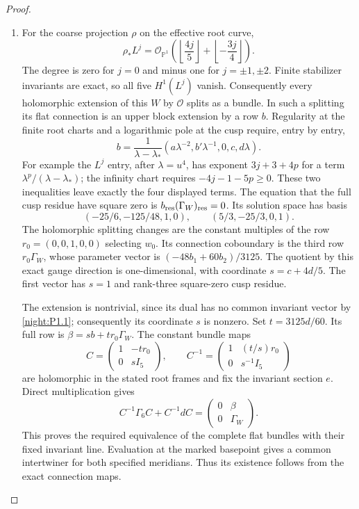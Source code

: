 \begin{proof}
\begin{enumerate}[label={$\langle1\rangle$\arabic*.}]
\item For the coarse projection $\rho$ on the effective root curve,
\[
 \rho_*L^j=\mathcal O_{\mathbb P^1}
 \left(\left\lfloor\frac{4j}{5}\right\rfloor+
       \left\lfloor-\frac{3j}{4}\right\rfloor\right).
\]
The degree is zero for $j=0$ and minus one for $j=\pm1,\pm2$.
Finite stabilizer invariants are exact, so all five $H^1(L^j)$ vanish.  Consequently every holomorphic
extension of this $W$ by $\mathcal O$ splits as a bundle.
In such a splitting its flat connection is an upper block extension
by a row $b$.  Regularity at the finite root charts and a logarithmic
pole at the cusp require, entry by entry,
\[
b=\frac1{\lambda-\lambda_*}
 (a\lambda^{-2},b'\lambda^{-1},0,c,d\lambda).
\]
For example the $L^j$ entry, after $\lambda=u^4$, has exponent
$3j+3+4p$ for a term $\lambda^p/ (\lambda-\lambda_*)$;
the infinity chart requires $-4j-1-5p\geq0$.
These two inequalities leave exactly the four displayed terms.
The equation that the full cusp residue have square zero is
$b_{\rm res}(\Gamma_W)_{\rm res}=0$.
Its solution space has basis
\[
(-25/6,-125/48,1,0),\qquad(5/3,-25/3,0,1).
\]
The holomorphic splitting changes are the constant multiples of the
row $r_0=(0,0,1,0,0)$ selecting $w_0$.  Its connection coboundary
is the third row $r_0\Gamma_W$, whose parameter vector is
$(-48b_1+60b_2)/3125$.  The quotient by this exact gauge direction
is one-dimensional, with coordinate $s=c+4d/5$.  The first
vector has $s=1$ and rank-three square-zero cusp residue.

The extension is nontrivial, since its dual has no common
invariant vector by \cref{night:P1.1}; consequently its coordinate $s$ is nonzero.
Set $t=3125d/60$.  Its full row is
$\beta=s b+t r_0\Gamma_W$.  The constant bundle maps
\[
 C=\begin{pmatrix}1&-t r_0\\0&sI_5\end{pmatrix},\qquad
 C^{-1}=\begin{pmatrix}1&(t/s)r_0\\0&s^{-1}I_5\end{pmatrix}
\]
are holomorphic in the stated root frames and fix the invariant
section $e$.  Direct multiplication gives
\[
 C^{-1}\Gamma_6 C+C^{-1}dC
   =\begin{pmatrix}0&\beta\\0&\Gamma_W\end{pmatrix}.
\]
This proves the required equivalence of the complete flat bundles
with their fixed invariant line.  Evaluation at the marked basepoint
gives a common intertwiner for both specified meridians.  Thus its
existence follows from the exact connection maps.  


\end{enumerate}
\end{proof}
